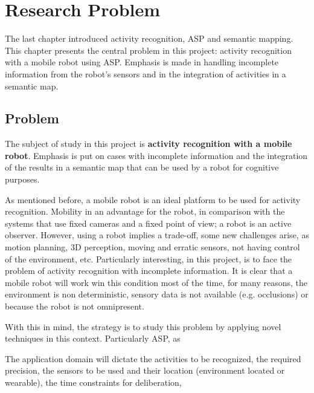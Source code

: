 \chapter{Research Problem}

The last chapter introduced activity recognition, ASP and semantic mapping.
This chapter presents the central problem in this project: activity recognition with a mobile robot using ASP.
Emphasis is made in handling incomplete information from the robot's sensors and in the integration of activities in a semantic map.

\section{Problem}


The subject of study in this project is \textbf{activity recognition with a mobile robot}.
Emphasis is put on cases with incomplete information and the integration of the results in a semantic map that can be used by a robot for cognitive purposes.

As mentioned before, a mobile robot is an ideal platform to be used for activity recognition. 
Mobility in an advantage for the robot, in comparison with the systems that use fixed cameras and a fixed point of view; a robot is an active observer.
However, using a robot implies a trade-off, some new challenges arise, as motion planning, 3D perception, moving and erratic sensors, not having control of the environment, etc.
Particularly interesting, in this project, is to face the problem of activity recognition with incomplete information.
It is clear that a mobile robot will work win this condition most of the time, for many reasons, the environment is non deterministic, sensory data is not available (e.g. occlusions) or because the robot is not omnipresent.

With this in mind, the strategy is to study this problem by applying novel techniques in this context. Particularly ASP, as %

The application domain will dictate the activities to be recognized, the required precision, the sensors to be used and their location (environment located or wearable), the time constraints for deliberation,




